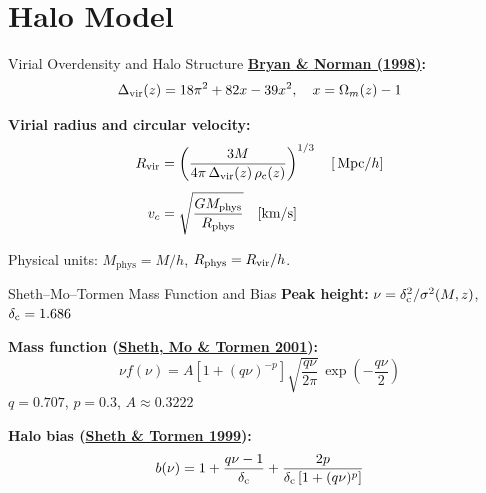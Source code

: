 \section{Halo Model}

\begin{frame}{Virial Overdensity and Halo Structure}
\textbf{\href{https://arxiv.org/abs/astro-ph/9710107}{Bryan \& Norman (1998)}:}
\begin{equation}
\Delta_{\mathrm{vir}}(z) = 18\pi^2 + 82x - 39x^2, \quad x = \Omega_m(z) - 1
\end{equation}

\textbf{Virial radius and circular velocity:}
\begin{align}
R_{\mathrm{vir}} &= \left(\frac{3M}{4\pi\,\Delta_{\mathrm{vir}}(z)\,\rho_{\mathrm{c}}(z)}\right)^{1/3} \quad [\,\mathrm{Mpc}/h] \\[4pt]
v_c &= \sqrt{\frac{GM_{\mathrm{phys}}}{R_{\mathrm{phys}}}} \quad [\mathrm{km/s}]
\end{align}

Physical units: $M_{\mathrm{phys}} = M/h$, $R_{\mathrm{phys}} = R_{\mathrm{vir}}/h$.
\end{frame}

\begin{frame}{Sheth--Mo--Tormen Mass Function and Bias}
\textbf{Peak height:} $\nu = \delta_{\mathrm{c}}^2 / \sigma^2(M,z)$, \quad $\delta_{\mathrm{c}} = 1.686$

\vspace{0.2cm}
\textbf{Mass function (\href{https://arxiv.org/abs/astro-ph/9907024}{Sheth, Mo \& Tormen 2001}):}
\begin{equation}
\nu f(\nu) = A\left[1 + (q\nu)^{-p}\right]\sqrt{\frac{q\nu}{2\pi}}\,\exp\!\left(-\frac{q\nu}{2}\right)
\end{equation}
$q = 0.707$, $p = 0.3$, $A \approx 0.3222$

\vspace{0.3cm}
\textbf{Halo bias (\href{https://arxiv.org/abs/astro-ph/9901122}{Sheth \& Tormen 1999}):}
\begin{equation}
b(\nu) = 1 + \frac{q\nu - 1}{\delta_{\mathrm{c}}} + \frac{2p}{\delta_{\mathrm{c}}\left[1 + (q\nu)^p\right]}
\end{equation}
\end{frame}


